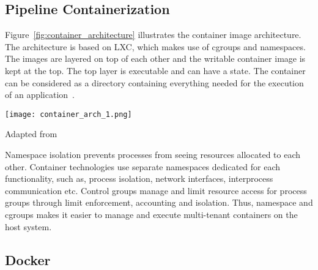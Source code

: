
\subsection{Pipeline Containerization}
Figure~\ref{fig:container_architecture} illustrates the container image 
architecture. %
The architecture is based on LXC, which makes use of cgroups and namespaces. The images are layered 
on top of each other and the writable container image is kept at the 
top. The top layer is executable and can have a state. The container 
can be considered as a directory containing everything needed for 
the execution of an application~\cite{7158965}.\\

\begin{center}
\texttt{[image: container\_arch\_1.png]}
\caption*{Adapted from \cite{7158965}}
\label{fig:container_architecture}
\end{center}

Namespace isolation prevents processes from seeing resources allocated to each other. Container technologies use separate namespaces dedicated for each functionality, such as, process isolation, network interfaces, interprocess communication etc. Control groups manage and limit resource access for process groups through limit enforcement, accounting and isolation. Thus, namespace and cgroups makes it easier to manage and execute multi-tenant containers on the host system.

\subsection{Docker}

